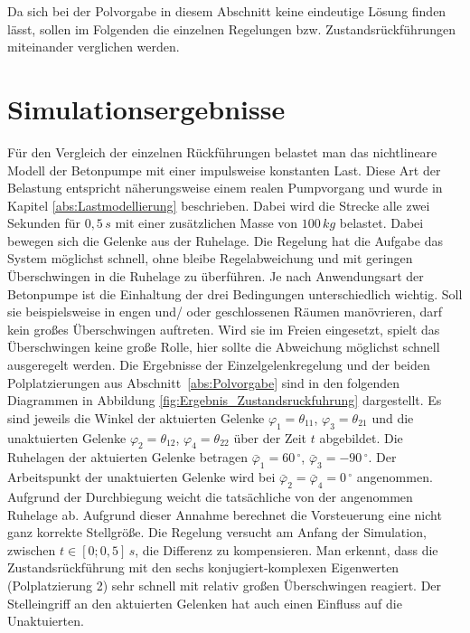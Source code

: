 Da sich bei der Polvorgabe in diesem Abschnitt keine eindeutige Lösung finden lässt, sollen im Folgenden die einzelnen Regelungen bzw. Zustandsrückführungen miteinander verglichen werden.

\section{Simulationsergebnisse}

Für den Vergleich der einzelnen Rückführungen belastet man das nichtlineare Modell der Betonpumpe mit einer impulsweise konstanten Last. Diese Art der Belastung entspricht näherungsweise einem realen Pumpvorgang und wurde in Kapitel \ref{abs:Lastmodellierung} beschrieben. Dabei wird die Strecke alle zwei Sekunden für $0,5\,\si{s}$ mit einer zusätzlichen Masse von $100\,\si{kg}$ belastet. Dabei bewegen sich die Gelenke aus der Ruhelage. Die Regelung hat die Aufgabe das System  möglichst schnell, ohne bleibe Regelabweichung und mit geringen Überschwingen in die Ruhelage zu überführen. \newline
Je nach Anwendungsart der Betonpumpe ist die Einhaltung der drei Bedingungen unterschiedlich wichtig. Soll sie beispielsweise in engen und/ oder geschlossenen Räumen manövrieren, darf kein großes Überschwingen auftreten. Wird sie im Freien eingesetzt, spielt das Überschwingen keine große Rolle, hier sollte die Abweichung möglichst schnell ausgeregelt werden. \newline
Die Ergebnisse der Einzelgelenkregelung und der beiden Polplatzierungen aus \mbox{Abschnitt \ref{abs:Polvorgabe}} sind in den folgenden Diagrammen in Abbildung \ref{fig:Ergebnis_Zustandsruckfuhrung} dargestellt. Es sind jeweils die Winkel der aktuierten Gelenke  $\varphi_1 = \theta_{11}$, $\varphi_3 = \theta_{21}$ und die unaktuierten Gelenke $\varphi_2 = \theta_{12}$, $\varphi_4 = \theta_{22}$ über der Zeit $t$ abgebildet. Die Ruhelagen der aktuierten Gelenke betragen $\bar{\varphi}_1 = 60 \,^\circ$, $\bar{\varphi}_3 = -90\,^\circ$. Der Arbeitspunkt der unaktuierten Gelenke wird bei $\bar{\varphi}_2 = \bar{\varphi}_4 = 0 \,^\circ$ angenommen. Aufgrund der Durchbiegung weicht die tatsächliche von der angenommen Ruhelage ab.\newline
Aufgrund dieser Annahme berechnet die Vorsteuerung eine nicht ganz korrekte Stellgröße. Die Regelung versucht am Anfang der Simulation, zwischen $t\in[0;0,5]\,\si{s}$, die  Differenz zu kompensieren. Man erkennt, dass die Zustandsrückführung mit den sechs konjugiert-komplexen Eigenwerten (Polplatzierung 2) sehr schnell mit relativ großen Überschwingen reagiert. Der Stelleingriff an den aktuierten Gelenken hat auch einen Einfluss auf die Unaktuierten.   
    
